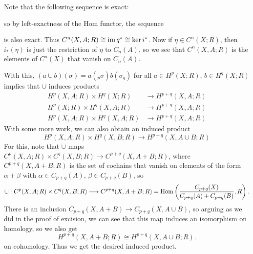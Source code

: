 \begin{remark}
  Note that the following sequence is exact:
  \begin{center}
  \end{center}
  so by left-exactness of the
  Hom functor, the sequence
  \begin{center}
  \end{center}
  is also exact. Thus
  $C^n(X, A; R) \cong \operatorname{im} q^* \cong \ker i^*$.
  Now if $\eta \in C^n(X; R)$, then
  $i_*(\eta)$ is just the restriction
  of $\eta$ to $C_n(A)$, so we see that
  $C^n(X, A; R)$ is the elements of
  $C^n(X)$ that vanish on $C_n(A)$.

  With this, $(a \cup b)(\sigma) = a(
  {}_p \sigma) b(\sigma_q)$ for
  all $a \in H^p(X; R)$, $b \in H^q(X; R)$
  implies that $\cup$ induces products
  \begin{align*}
    H^p(X, A; R) \times H^q(X; R)
    &\longrightarrow
    H^{p+q}(X, A; R) \\
    H^p(X; R) \times H^q(X, A; R)
    &\longrightarrow
    H^{p+q}(X, A; R) \\
    H^p(X, A; R) \times H^q(X, A; R)
    &\longrightarrow
    H^{p+q}(X, A; R)
  \end{align*}
  With some more work, we can also obtain an
  induced product
  \[
    H^p(X, A; R) \times H^q(X, B; R)
    \longrightarrow H^{p+q}(X, A \cup B; R)
  \]
  For this, note that $\cup$
  maps $C^p(X, A; R) \times C^q(X, B; R) \to C^{p + q}(X, A + B; R)$,
  where $C^{p + q}(X, A + B; R)$ is the set
  of cochains that vanish on elements of
  the form $\alpha + \beta$ with
  $\alpha \in C_{p + q}(A)$, $\beta \in C_{p + q}(B)$, so
  \[
    \cup : C^p(X, A; R) \times C^q(X, B; R) \longrightarrow C^{p + q}(X, A + B; R)
    = \operatorname{Hom}\left(\frac{C_{p + q}(X)}{C_{p + q}(A) + C_{p + q}(B)}, R\right).
  \]
  There is an inclusion $C_{p + q}(X, A + B) \to C_{p + q}(X, A \cup B)$, so
  arguing as we did in the proof of excision,
  we can see that this map induces an
  isomorphism on homology, so we also
  get
  \[
    H^{p + q}(X, A + B; R) \cong
    H^{p + q}(X, A \cup B; R).
  \]
  on cohomology. Thus we get the desired
  induced product.
\end{remark}

